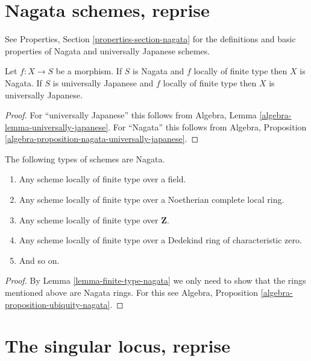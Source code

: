 \section{Nagata schemes, reprise}
\label{section-nagata}

\noindent
See Properties, Section \ref{properties-section-nagata} for the definitions
and basic properties of Nagata and universally Japanese schemes.

\begin{lemma}
\label{lemma-finite-type-nagata}
Let $f : X \to S$ be a morphism.
If $S$ is Nagata and $f$ locally of finite type then $X$ is Nagata.
If $S$ is universally Japanese
and $f$ locally of finite type then $X$ is universally Japanese.
\end{lemma}

\begin{proof}
For ``universally Japanese'' this follows from
Algebra, Lemma \ref{algebra-lemma-universally-japanese}.
For ``Nagata'' this follows from
Algebra, Proposition \ref{algebra-proposition-nagata-universally-japanese}.
\end{proof}

\begin{lemma}
\label{lemma-ubiquity-nagata}
The following types of schemes are Nagata.
\begin{enumerate}
\item Any scheme locally of finite type over a field.
\item Any scheme locally of finite type over a Noetherian complete local ring.
\item Any scheme locally of finite type over $\mathbf{Z}$.
\item Any scheme locally of finite type over a Dedekind ring of
characteristic zero.
\item And so on.
\end{enumerate}
\end{lemma}

\begin{proof}
By Lemma \ref{lemma-finite-type-nagata} we only need to show that
the rings mentioned above are Nagata rings. For this see
Algebra, Proposition \ref{algebra-proposition-ubiquity-nagata}.
\end{proof}


\section{The singular locus, reprise}
\label{section-singular-locus}

